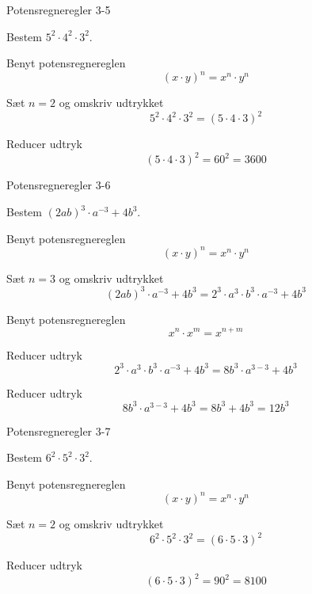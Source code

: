 \documentclass{article}
\begin{document}
\newpage

\begin{exercise}{Potensregneregler 3-5}
	
	Bestem $5^2 \cdot 4^2 \cdot 3^2$.
	
	
	\hint
	
	Benyt potensregnereglen
	\[
	(x \cdot y)^n = x^n \cdot y^n
	\]
	
	\hint
	
	Sæt $n=2$ og omskriv udtrykket
	\[
	5^2 \cdot 4^2 \cdot 3^2  = \left(5 \cdot 4 \cdot 3 \right)^2	
	\]
	
	\hint
	
	Reducer udtryk
	\[
	\left(5 \cdot 4 \cdot 3 \right)^2  = 60^2 = 3600
	\]
	
	
\end{exercise}

\newpage

\begin{exercise}{Potensregneregler 3-6}
	
	Bestem $(2ab)^3 \cdot a^{-3}+4b^3$.
	
	
	\hint
	
	Benyt potensregnereglen
	\[
	(x \cdot y)^n = x^n \cdot y^n
	\]
	
	\hint
	
	Sæt $n=3$ og omskriv udtrykket
	\[
	(2ab)^3 \cdot a^{-3}+4b^3 = 2^3 \cdot a^3 \cdot b^3 \cdot a^{-3}+4b^3 
	\]
	
	
	\hint
	
	Benyt potensregnereglen
	\[
	x^n \cdot x^m = x^{n+m}
	\]
	
	\hint
	
	Reducer udtryk
	\[
	2^3 \cdot a^3 \cdot b^3 \cdot a^{-3}+4b^3 = 8 b^3 \cdot a^{3-3} + 4b^3
	\]
	
	\hint 
	
	Reducer udtryk
	\[
	8 b^3 \cdot a^{3-3} + 4b^3 = 8 b^3 + 4b^3  = 12b^3
	\]
	
	
	
\end{exercise}

\newpage

\begin{exercise}{Potensregneregler 3-7}
	
	Bestem $6^2 \cdot 5^2 \cdot 3^2$.
	
	
	\hint
	
	Benyt potensregnereglen
	\[
	(x \cdot y)^n = x^n \cdot y^n
	\]
	
	\hint
	
	Sæt $n=2$ og omskriv udtrykket
	\[
	6^2 \cdot 5^2 \cdot 3^2 = (6 \cdot 5 \cdot 3)^2
	\]
	
	\hint

	Reducer udtryk
	\[
	(6 \cdot 5 \cdot 3)^2 = 90^2 = 8100
	\]
	
	
\end{exercise}
\end{document}
